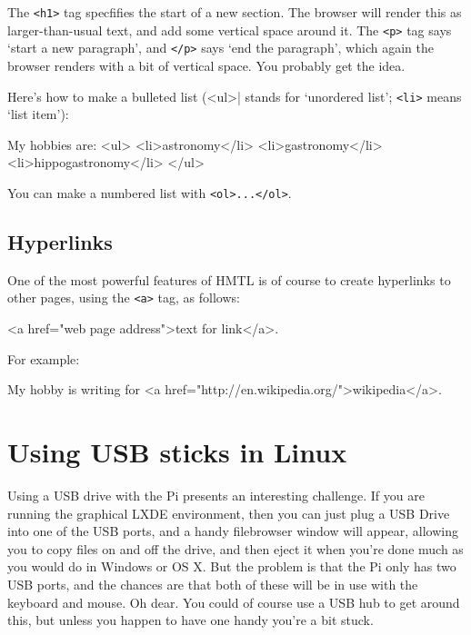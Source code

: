 The \verb|<h1>| tag specfifies the start of a new section. The browser
will render this as larger-than-usual text, and add some vertical
space around it. The \verb|<p>| tag says `start a new paragraph', and
\verb|</p>| says `end the paragraph', which again the browser renders
with a bit of vertical space. You probably get the idea.

Here's how to make a bulleted list (\verb||<ul>| stands for `unordered
list'; \verb|<li>| means `list item'):

\begin{ttoutenv}
My hobbies are:
<ul>
<li>astronomy</li>
<li>gastronomy</li>
<li>hippogastronomy</li>
</ul>
\end{ttoutenv}

You can make a numbered list with \verb|<ol>...</ol>|.

\subsection{Hyperlinks}

One of the most powerful features of HMTL is of course to create hyperlinks to
other pages, using the \verb|<a>| tag, as follows:

\begin{ttoutenv}
<a href="web page address">text for link</a>.
\end{ttoutenv}

For example:

\begin{ttoutenv}
My hobby is writing for <a href="http://en.wikipedia.org/">wikipedia</a>.
\end{ttoutenv}

\section{Using USB sticks in Linux}
\label{appendix:usingUSB}

Using a USB drive with the Pi presents an interesting challenge. If you are running the graphical LXDE environment, then you can just plug a USB Drive into one of the USB ports, and a handy filebrowser window will appear, allowing you to copy files on and off the drive, and then eject it when you're done much as you would do in Windows or OS X. But the problem is that the Pi only has two USB ports, and the chances are that both of these will be in use with the keyboard and mouse. Oh dear. You could of course use a USB hub to get around this, but unless you happen to have one handy you're a bit stuck. 

